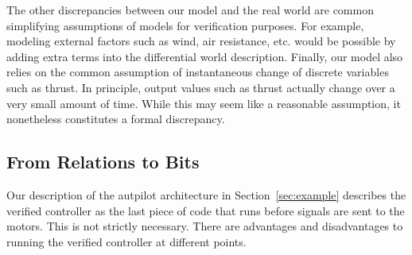 The other discrepancies between our model and the real world are common
simplifying assumptions of models for verification purposes.  For example,
modeling external factors such as wind, air resistance, etc. would be
possible by adding extra terms into the differential world description.
Finally, our model also relies on the common assumption of instantaneous
change of discrete variables such as thrust.  In principle, output values
such as thrust actually change over a very small amount of time.  While
this may seem like a reasonable assumption, it nonetheless constitutes a
formal discrepancy.

\subsection{From Relations to Bits}
\label{sec:discrete-model}

Our description of the autpilot architecture in Section~\ref{sec:example}
describes the verified controller as the last piece of code that runs
before signals are sent to the motors.  This is not strictly necessary.
There are advantages and disadvantages to running the verified controller
at different points.


